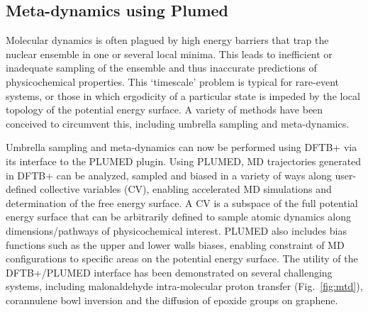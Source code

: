 \documentclass[reprint,onecolumn,superscriptaddress]{revtex4-1}
\newcommand{\dftbp}{DFTB+}
\begin{document}
\subsection{Meta-dynamics using Plumed}

Molecular dynamics is often plagued by high energy barriers that trap the
nuclear ensemble in one or several local minima. This leads to inefficient or
inadequate sampling of the ensemble and thus inaccurate predictions of
physicochemical properties.\cite{RN1,RN2,RN3} This `timescale' problem is
typical for rare-event systems, or those in which ergodicity of a particular
state is impeded by the local topology of the potential energy surface. A
variety of methods have been conceived to circumvent this, including
umbrella sampling\cite{RN8} and meta-dynamics.\cite{RN13}

Umbrella sampling and meta-dynamics can now be performed using \dftbp{} via its
interface to the PLUMED plugin.\cite{RN15,RN16} Using PLUMED, MD trajectories
generated in \dftbp{} can be analyzed, sampled and biased in a variety of ways
along user-defined collective variables (CV), enabling accelerated MD
simulations and determination of the free energy surface. A CV is a subspace of
the full potential energy surface that can be arbitrarily defined to sample
atomic dynamics along dimensions/pathways of physicochemical interest.  PLUMED
also includes bias functions such as the upper and lower walls biases, enabling
constraint of MD configurations to specific areas on the potential energy
surface. The utility of the \dftbp{}/PLUMED interface has been demonstrated on
several challenging systems, including malonaldehyde intra-molecular proton
transfer (Fig.~\ref{fig:mtd}), corannulene bowl inversion and the diffusion of
epoxide groups on graphene.\cite{RN16}
\end{document}
